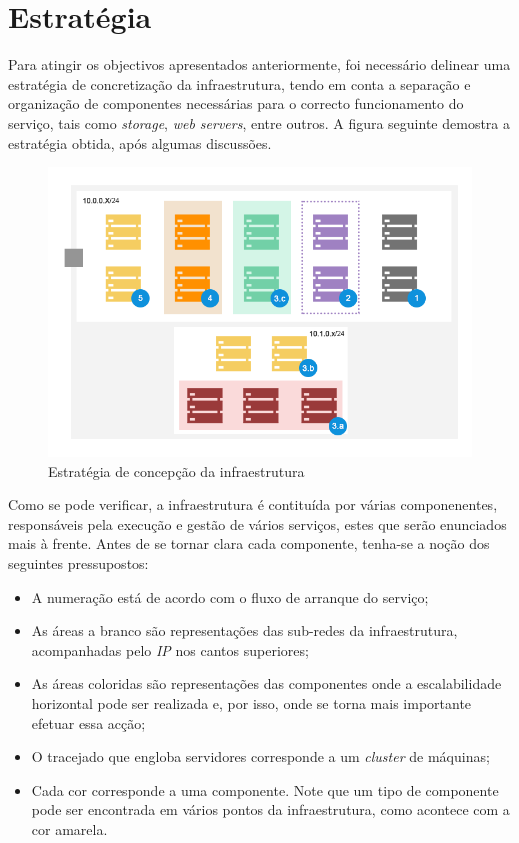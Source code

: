 \section{Estratégia}

Para atingir os objectivos apresentados anteriormente, foi necessário delinear uma estratégia de concretização da infraestrutura, tendo em conta a separação e organização de componentes necessárias para o correcto funcionamento do serviço, tais como \emph{storage}, \emph{web servers}, entre outros.
A figura seguinte demostra a estratégia obtida, após algumas discussões.

\begin{figure}[H]
\centerline{\includegraphics[width=1\textwidth]{images/infrastructure/strategy}}
\label{fig:infrastructure-strategy}
\caption{Estratégia de concepção da infraestrutura}
\end{figure}

Como se pode verificar, a infraestrutura é contituída por várias componenentes, responsáveis pela execução e gestão de vários serviços, estes que serão enunciados mais à frente. Antes de se tornar clara cada componente, tenha-se a noção dos seguintes pressupostos:

\begin{itemize}
	\item A numeração está de acordo com o fluxo de arranque do serviço;
	\item As áreas a branco são representações das sub-redes da infraestrutura, acompanhadas pelo \emph{IP} nos cantos superiores;
	\item As áreas coloridas são representações das componentes onde a escalabilidade horizontal pode ser realizada e, por isso, onde se torna mais importante efetuar essa acção;
	\item O tracejado que engloba servidores corresponde a um \emph{cluster} de máquinas;
	\item Cada cor corresponde a uma componente. Note que um tipo de componente pode ser encontrada em vários pontos da infraestrutura, como acontece com a cor amarela.
\end{itemize}


